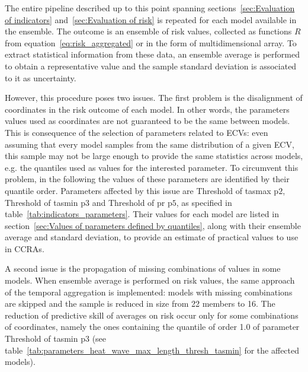 The entire pipeline described up to this point spanning sections~\ref{sec:Evaluation of indicators} and~\ref{sec:Evaluation of risk} is repeated for each model available in the ensemble. The outcome is an ensemble of \gls{risk} values, collected as functions $R$ from equation~\eqref{eq:risk_aggregated} or in the form of multidimensional array. To extract statistical information from these data, an ensemble average is performed to obtain a representative value and the sample standard deviation is associated to it as uncertainty.

However, this procedure poses two issues.
The first problem is the disalignment of coordinates in the risk outcome of each model. In other words, the parameters values used as coordinates are not guaranteed to be the same between models. This is consequence of the selection of parameters related to \glspl{ECV}: even assuming that every model samples from the same distribution of a given \gls{ECV}, this sample may not be large enough to provide the same statistics across models, e.g. the quantiles used as values for the interested parameter. To circumvent this problem, in the following the values of these parameters are identified by their quantile order. Parameters affected by this issue are {Threshold of \gls{tasmax}} $\mathrm{p2}$, {Threshold of \gls{tasmin}} $\mathrm{p3}$ and {Threshold of \gls{pr}} $\mathrm{p5}$, as specified in table~\ref{tab:indicators_parameters}. Their values for each model are listed in section~\ref{sec:Values of parameters defined by quantiles}, along with their ensemble average and standard deviation, to provide an estimate of practical values to use in \glspl{CCRA}.

A second issue is the propagation of missing combinations of values in some models. When ensemble average is performed on risk values, the same approach of the temporal aggregation is implemented: models with missing combinations are skipped and the sample is reduced in size from 22 members to 16. The reduction of predictive skill of averages on risk occur only for some combinations of coordinates, namely the ones containing the quantile of order \num{1.0} of parameter {Threshold of \gls{tasmin}} $\mathrm{p3}$ (see table~\ref{tab:parameters_heat_wave_max_length_thresh_tasmin} for the affected models).

